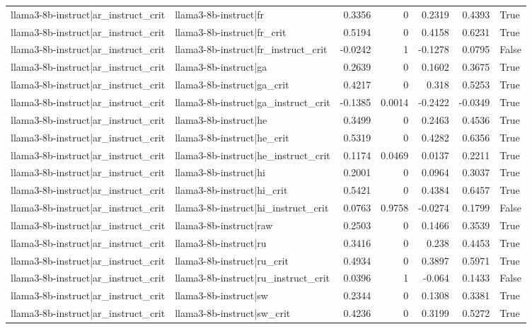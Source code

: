 \begin{table}
\begin{tabular}{l l r r r r l}
llama3-8b-instruct|ar_instruct_crit & llama3-8b-instruct|fr & 0.3356 & 0 & 0.2319 & 0.4393 & True \\
llama3-8b-instruct|ar_instruct_crit & llama3-8b-instruct|fr_crit & 0.5194 & 0 & 0.4158 & 0.6231 & True \\
llama3-8b-instruct|ar_instruct_crit & llama3-8b-instruct|fr_instruct_crit & -0.0242 & 1 & -0.1278 & 0.0795 & False \\
llama3-8b-instruct|ar_instruct_crit & llama3-8b-instruct|ga & 0.2639 & 0 & 0.1602 & 0.3675 & True \\
llama3-8b-instruct|ar_instruct_crit & llama3-8b-instruct|ga_crit & 0.4217 & 0 & 0.318 & 0.5253 & True \\
llama3-8b-instruct|ar_instruct_crit & llama3-8b-instruct|ga_instruct_crit & -0.1385 & 0.0014 & -0.2422 & -0.0349 & True \\
llama3-8b-instruct|ar_instruct_crit & llama3-8b-instruct|he & 0.3499 & 0 & 0.2463 & 0.4536 & True \\
llama3-8b-instruct|ar_instruct_crit & llama3-8b-instruct|he_crit & 0.5319 & 0 & 0.4282 & 0.6356 & True \\
llama3-8b-instruct|ar_instruct_crit & llama3-8b-instruct|he_instruct_crit & 0.1174 & 0.0469 & 0.0137 & 0.2211 & True \\
llama3-8b-instruct|ar_instruct_crit & llama3-8b-instruct|hi & 0.2001 & 0 & 0.0964 & 0.3037 & True \\
llama3-8b-instruct|ar_instruct_crit & llama3-8b-instruct|hi_crit & 0.5421 & 0 & 0.4384 & 0.6457 & True \\
llama3-8b-instruct|ar_instruct_crit & llama3-8b-instruct|hi_instruct_crit & 0.0763 & 0.9758 & -0.0274 & 0.1799 & False \\
llama3-8b-instruct|ar_instruct_crit & llama3-8b-instruct|raw & 0.2503 & 0 & 0.1466 & 0.3539 & True \\
llama3-8b-instruct|ar_instruct_crit & llama3-8b-instruct|ru & 0.3416 & 0 & 0.238 & 0.4453 & True \\
llama3-8b-instruct|ar_instruct_crit & llama3-8b-instruct|ru_crit & 0.4934 & 0 & 0.3897 & 0.5971 & True \\
llama3-8b-instruct|ar_instruct_crit & llama3-8b-instruct|ru_instruct_crit & 0.0396 & 1 & -0.064 & 0.1433 & False \\
llama3-8b-instruct|ar_instruct_crit & llama3-8b-instruct|sw & 0.2344 & 0 & 0.1308 & 0.3381 & True \\
llama3-8b-instruct|ar_instruct_crit & llama3-8b-instruct|sw_crit & 0.4236 & 0 & 0.3199 & 0.5272 & True \\

\end{tabular}
\end{table}

